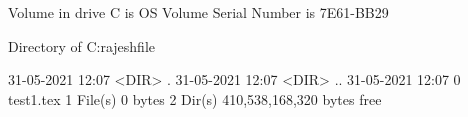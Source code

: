  Volume in drive C is OS
 Volume Serial Number is 7E61-BB29

 Directory of C:\Users\Bomagouni rajesh\OneDrive\Desktop\project file

31-05-2021  12:07    <DIR>          .
31-05-2021  12:07    <DIR>          ..
31-05-2021  12:07                 0 test1.tex
               1 File(s)              0 bytes
               2 Dir(s)  410,538,168,320 bytes free
